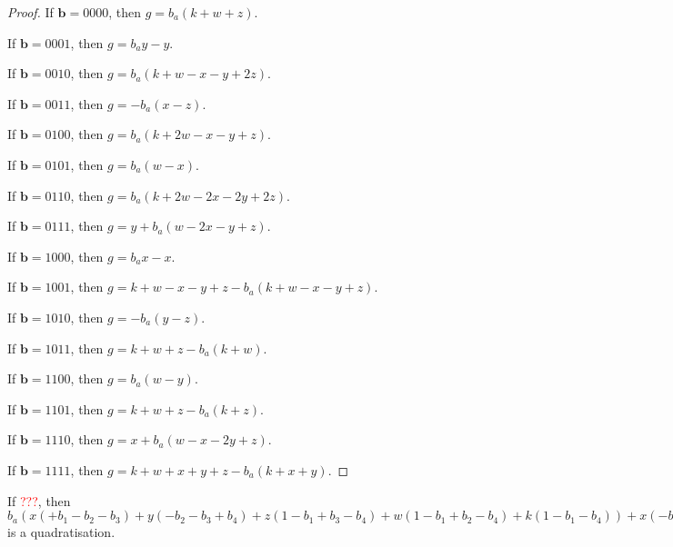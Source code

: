 \documentclass[11pt]{scrartcl}
\newcommand{\vc}[1]{\boldsymbol{#1}}
\begin{document}
\begin{proof}
If $\vc b = 0000$, then $g = b_a(k + w + z)$.

If $\vc b = 0001$, then $g = b_ay - y$.

If $\vc b = 0010$, then $g = b_a(k + w - x - y + 2z)$.

If $\vc b = 0011$, then $g = -b_a(x - z)$.

If $\vc b = 0100$, then $g = b_a(k + 2w - x - y + z)$.

If $\vc b = 0101$, then $g = b_a(w - x)$.

If $\vc b = 0110$, then $g = b_a(k + 2w - 2x - 2y + 2z)$.

If $\vc b = 0111$, then $g = y + b_a(w - 2x - y + z)$.

If $\vc b = 1000$, then $g = b_ax - x$.

If $\vc b = 1001$, then $g = k + w - x - y + z - b_a(k + w - x - y + z)$.

If $\vc b = 1010$, then $g = -b_a(y - z)$.

If $\vc b = 1011$, then $g = k + w + z - b_a(k + w)$.

If $\vc b = 1100$, then $g = b_a(w - y)$.

If $\vc b = 1101$, then $g = k + w + z - b_a(k + z)$.

If $\vc b = 1110$, then $g = x + b_a(w - x - 2y + z)$.

If $\vc b = 1111$, then $g = k + w + x + y + z - b_a(k + x + y)$.

\end{proof}

\begin{lemma}
 If \textcolor{red}{???}, then $b_a(x(+b_1-b_2-b_3)+y(-b_2-b_3+b_4)+z(1-b_1+b_3-b_4)+w(1-b_1+b_2-b_4)+k(1-b_1-b_4))+x(-b_1+b_1b_2+b_1b_3)+y(-b_4+b_2b_4+b_3b_4)+z(+b_1b_4)+w(+b_1b_4)+k(+b_1b_4)$ is a quadratisation.\\
 \end{lemma}
\end{document}
